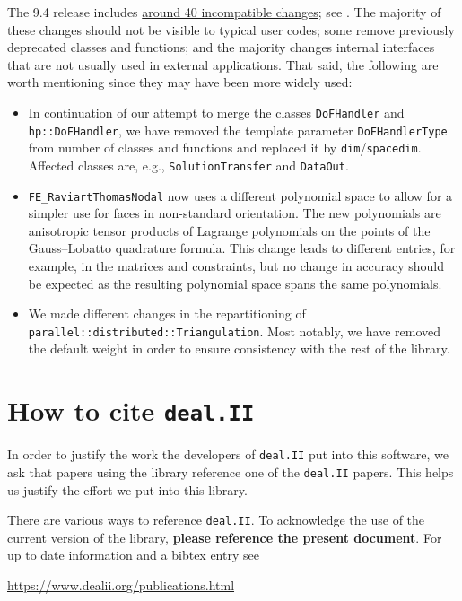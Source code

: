 \documentclass{ansarticle-preprint}
\newcommand{\specialword}[1]{\texttt{#1}}
\newcommand{\dealii}{{\specialword{deal.II}}\xspace}
\begin{document}
The 9.4 release includes
\href{https://dealii.org/developer/doxygen/deal.II/changes_between_9_3_0_and_9_4_0.html}
{around 40 incompatible changes}; see \cite{changes94}. The majority of these changes
should not be visible to typical user codes; some remove previously
deprecated classes and functions; and the majority changes internal
interfaces that are not usually used in external
applications. That said, the following are worth mentioning since they
may have been more widely used:
\begin{itemize}
  \item In continuation of our attempt to merge the classes \texttt{DoFHandler} and \texttt{hp::DoFHandler}, we have removed the
  template parameter \texttt{DoFHandlerType} from number of classes and
  functions and replaced it by \texttt{dim}/\texttt{spacedim}. Affected
  classes are, e.g., \texttt{SolutionTransfer} and \texttt{DataOut}. 
  \item \texttt{FE\_RaviartThomasNodal} now uses a different polynomial space to allow
  for a simpler use for faces in non-standard orientation. The new polynomials
  are anisotropic tensor products of Lagrange polynomials on the points of the
  Gauss--Lobatto quadrature formula. This change leads to different entries, for example, in
  the matrices and constraints, but no change in accuracy should be expected as the resulting polynomial
  space spans the same polynomials.
  \item We made different changes in the repartitioning of \texttt{parallel::distributed::Triangulation}.
  Most notably, we have removed the default weight in order to ensure consistency with the rest of the
  library.
\end{itemize}



\section{How to cite \dealii}\label{sec:cite}

In order to justify the work the developers of \dealii{} put into this
software, we ask that papers using the library reference one of the
\dealii{} papers. This helps us justify the effort we put into this library.

There are various ways to reference \dealii{}. To acknowledge the use of
the current version of the library, \textbf{please reference the present
  document}. For up to date information and a bibtex entry
see
\begin{center}
  \url{https://www.dealii.org/publications.html}
\end{center}
\end{document}

